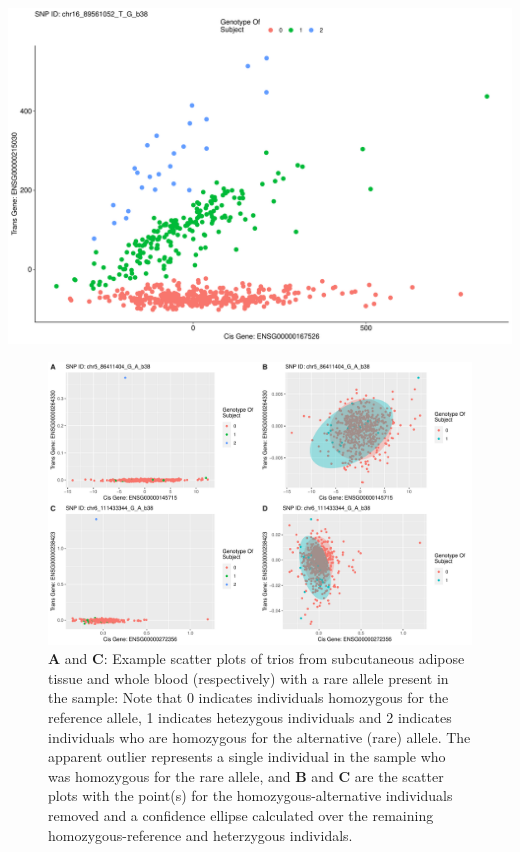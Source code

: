 \documentclass[
]{article}
\begin{document}
\includegraphics{12_15_2021_GMAC_plots_all_trios_files/figure-latex/unnamed-chunk-9-1.pdf}

\begin{figure}
\centering
\includegraphics{12_15_2021_GMAC_plots_all_trios_files/figure-latex/unnamed-chunk-10-1.pdf}
\caption{\textbf{A} and \textbf{C}: Example scatter plots of trios from
subcutaneous adipose tissue and whole blood (respectively) with a rare
allele present in the sample: Note that 0 indicates individuals
homozygous for the reference allele, 1 indicates hetezygous individuals
and 2 indicates individuals who are homozygous for the alternative
(rare) allele. The apparent outlier represents a single individual in
the sample who was homozygous for the rare allele, and \textbf{B} and
\textbf{C} are the scatter plots with the point(s) for the
homozygous-alternative individuals removed and a confidence ellipse
calculated over the remaining homozygous-reference and heterzygous
individals.}
\end{figure}
\end{document}
